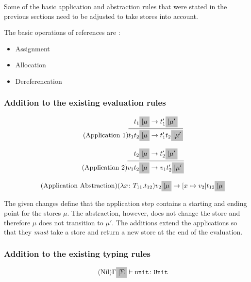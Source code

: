 Some of the basic application and abstraction rules that were stated in the previous
sections need to be adjusted to take stores into account.

The basic operations of references are \cite{pierce2002ProgLang}:

\begin{itemize}
    \item Assignment
    \item Allocation
    \item Dereferencation
\end{itemize}

\subsubsection{Addition to the existing evaluation rules \cite{pierce2002ProgLang}}
\begin{equation*}
    \tag{Application 1}
    \infer{
        t_1 t_2 \colorbox{lightgray}{$| \mu$} \rightarrow t'_1 t_2 \colorbox{lightgray}{$| \mu'$}
    }{
        t_1 \colorbox{lightgray}{$| \mu$} \rightarrow t'_1 \colorbox{lightgray}{$| \mu'$}
    }
\end{equation*}

\begin{equation*}
    \tag{Application 2}
    \infer{
        v_1 t_2 \colorbox{lightgray}{$| \mu$} \rightarrow v_1 t'_2 \colorbox{lightgray}{$| \mu'$}
    }{
        t_2 \colorbox{lightgray}{$| \mu$} \rightarrow t'_2 \colorbox{lightgray}{$| \mu'$}
    }
\end{equation*}

\begin{equation*}
    \tag{Application Abstraction}
    (\lambda x \colon T_{11} . t_{12}) v_2 \colorbox{lightgray}{$| \mu$} \rightarrow [x \mapsto v_2] t_{12} \colorbox{lightgray}{$| \mu$}
\end{equation*}

The given changes define that the application step contains
a starting and ending point for the stores $\mu$. The
abstraction, however, does not change the store and therefore $\mu$ does
not transition to $\mu'$. The additions extend the applications so that
they \textit{must} take a store and return a new store at the end
of the evaluation.

\subsubsection{Addition to the existing typing rules \cite{pierce2002ProgLang}}
\begin{equation*}
    \tag{Nil}
    \Gamma \colorbox{lightgray}{$| \Sigma$} \vdash \texttt{unit} \colon \texttt{Unit}
\end{equation*}

